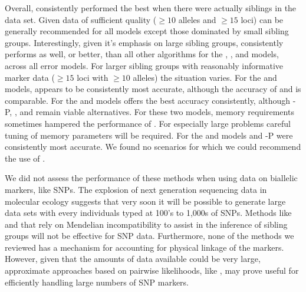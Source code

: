 Overall, \colony{} consistently performed the best when
there were actually siblings in the data set.  
Given data of sufficient quality ($\geq 10$ alleles and $\geq 15$ loci) \prt{} can be generally recommended for 
all models except those dominated by small sibling groups. Interestingly, given it's emphasis on large 
sibling groups, \prt{} consistently performs as well, or better, than all other algorithms for the \nosibs{}, 
\allhalf{}, and \allpathalf{} models, across all error models. 
For larger sibling groups with reasonably informative marker data
($\geq 15$ loci with $\geq 10$ alleles) the situation varies. For 
the \onelargenoh{} and \onelargewh{} models, \prt{} appears to be consistently 
most accurate, although the accuracy of \colony{} 
and \familyfinder{} is comparable. For the \slfsgnoh{} and \slfsgwh{} models \colony{} offers the best accuracy consistently, although 
\colony-P, \prt, and \familyfinder{} remain viable alternatives. For these two models, memory requirements sometimes hampered the 
performance of \prt{}. For especially large problems careful tuning of memory parameters will be required. 
For the \sfsnoh{} and  \sfswh{} models \colony{} and \colony-P were consistently most accurate.   
We found no scenarios for which we could recommend the use of \kinalyzer{}.

We did not assess the performance of these methods when using data on biallelic
markers, like SNPs.  The explosion of next generation sequencing data 
in molecular ecology suggests that very soon it will be possible to 
generate large data sets with every individuals typed at 100's to 1,000s
of SNPs.  Methods like \prt{} and \kinalyzer{} that rely on Mendelian 
incompatibility to assist in the inference of sibling groups will not
be effective for SNP data. Furthermore, none of the methods we reviewed 
has a mechanism for accounting for physical linkage of the markers.
However, given that the amounts of data available
could be very large, approximate approaches based on pairwise likelihoods,
like \familyfinder{}, may prove useful for efficiently handling 
large numbers of SNP markers.





